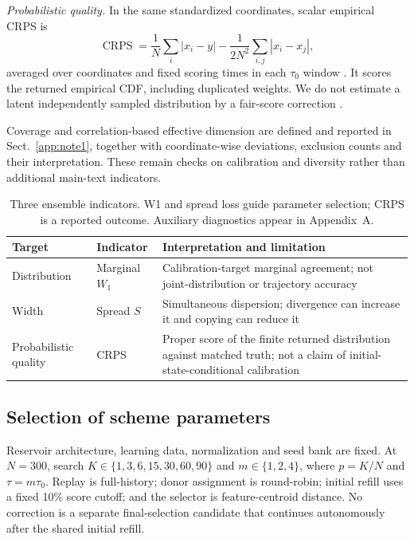 \documentclass[gmd,manuscript]{copernicus}
\begin{document}
\emph{Probabilistic quality.} In the same standardized coordinates, scalar empirical CRPS is
\begin{equation}
\operatorname{CRPS}=\frac1N\sum_i|x_i-y|-\frac1{2N^2}\sum_{i,j}|x_i-x_j|,
\end{equation}
averaged over coordinates and fixed scoring times in each $\tau_0$ window \citep{gneiting2007proper}. It scores the returned empirical CDF, including duplicated weights. We do not estimate a latent independently sampled distribution by a fair-score correction \citep{ferro2014fair}.

Coverage and correlation-based effective dimension are defined and reported in Sect.~\ref{app:note1}, together with coordinate-wise deviations, exclusion counts and their interpretation. These remain checks on calibration and diversity rather than additional main-text indicators.

\begin{table}[htbp]
\caption{Three ensemble indicators. W1 and spread loss guide parameter selection; CRPS is a reported outcome. Auxiliary diagnostics appear in Appendix~A.}
\label{tab:metrics}
\centering\small\begin{tabularx}{\textwidth}{>{\raggedright\arraybackslash}p{}>{\raggedright\arraybackslash}p{}>{\raggedright\arraybackslash}X}
\toprule
Target & Indicator & Interpretation and limitation \\ \midrule
Distribution & Marginal $W_1$ & Calibration-target marginal agreement; not joint-distribution or trajectory accuracy \\
Width & Spread $S$ & Simultaneous dispersion; divergence can increase it and copying can reduce it \\
Probabilistic quality & CRPS & Proper score of the finite returned distribution against matched truth; not a claim of initial-state-conditional calibration \\
\bottomrule\end{tabularx}
\end{table}

\subsection{Selection of scheme parameters}
Reservoir architecture, learning data, normalization and seed bank are fixed. At $N=300$, search $K\in\{1,3,6,15,30,60,90\}$ and $m\in\{1,2,4\}$, where $p=K/N$ and $\tau=m\tau_0$. Replay is full-history; donor assignment is round-robin; initial refill uses a fixed 10\% score cutoff; and the selector is feature-centroid distance. No correction is a separate final-selection candidate that continues autonomously after the shared initial refill.
\end{document}
